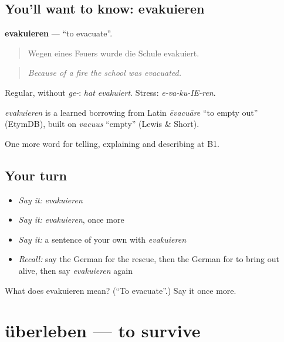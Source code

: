 \subsection*{You'll want to know: evakuieren}
\textbf{evakuieren} — \textquotedblleft{}to evacuate\textquotedblright{}.

\begin{quote}
Wegen eines Feuers wurde die Schule evakuiert.
\end{quote}

\begin{quote}
\emph{Because of a fire the school was evacuated.}
\end{quote}

Regular, without \emph{ge-}: \emph{hat evakuiert}. Stress: \emph{e-va-ku-IE-ren}.

\begin{cousinweb}
\emph{evakuieren} is a learned borrowing from Latin \emph{ēvacuāre} \textquotedblleft{}to empty out\textquotedblright{} (EtymDB), built on \emph{vacuus} \textquotedblleft{}empty\textquotedblright{} (Lewis \& Short).
\end{cousinweb}

\begin{grammarlens}[title={What you've built}]
One more word for telling, explaining and describing at B1.
\end{grammarlens}

\subsection*{Your turn}
\begin{itemize}
\raggedright
  \item \emph{Say it:} \emph{evakuieren}
  \item \emph{Say it:} \emph{evakuieren}, once more
  \item \emph{Say it:} a sentence of your own with \emph{evakuieren}
  \item \emph{Recall:} say the German for the rescue, then the German for to bring out alive, then say \emph{evakuieren} again
\end{itemize}

\begin{tcolorbox}[breakable,colback=teal!4,colframe=teal!35!black,title={Before you move on}]
What does evakuieren mean? (\textquotedblleft{}To evacuate\textquotedblright{}.) Say it once more.
\end{tcolorbox}
\section[überleben]{überleben — to survive}

